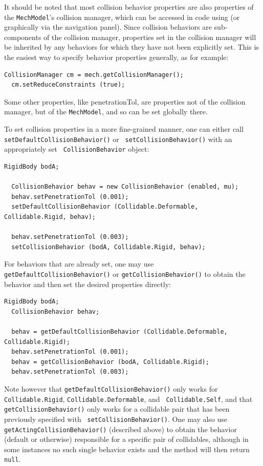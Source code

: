 It should be noted that most collision behavior properties are also
properties of the {\tt MechModel}'s collision manager, which can be
accessed in code using
(or graphically via the navigation panel).  Since collision behaviors
are sub-components of the collision manager, properties set in the
collision manager will be inherited by any behaviors for which they
have not been explicitly set. This is the easiest way to specify
behavior properties generally, as for example:
%
\begin{lstlisting}[]
  CollisionManager cm = mech.getCollisionManager();
  cm.setReduceConstraints (true);
\end{lstlisting}
%
Some other properties, like {\sf penetrationTol}, are properties not
of the collision manager, but of the {\tt MechModel}, and so can be
set globally there.

To set collision properties in a more fine-grained manner, one can
either call {\tt setDefaultCollisionBehavior()} or {\tt
setCollisionBehavior()} with an appropriately set {\tt
CollisionBehavior} object:
%
\begin{lstlisting}[]
  RigidBody bodA;

  CollisionBehavior behav = new CollisionBehavior (enabled, mu);
  behav.setPenetrationTol (0.001);
  setDefaultCollisionBehavior (Collidable.Deformable, Collidable.Rigid, behav);

  behav.setPenetrationTol (0.003);
  setCollisionBehavior (bodA, Collidable.Rigid, behav);
\end{lstlisting}
%
For behaviors that are already set, one may use {\tt
getDefaultCollisionBehavior()} or {\tt getCollisionBehavior()} to
obtain the behavior and then set the desired properties directly:
%
\begin{lstlisting}[]
  RigidBody bodA;
  CollisionBehavior behav;

  behav = getDefaultCollisionBehavior (Collidable.Deformable, Collidable.Rigid);
  behav.setPenetrationTol (0.001);
  behav = getCollisionBehavior (bodA, Collidable.Rigid);
  behav.setPenetrationTol (0.003);
\end{lstlisting}
%
Note however that {\tt getDefaultCollisionBehavior()} only works for
{\tt Collidable.Rigid}, {\tt Collidable.Deformable}, and {\tt
Collidable.Self}, and that {\tt getCollisionBehavior()} only works for
a collidable pair that has been previously specified with {\tt
setCollisionBehavior()}. One may also use {\tt
getActingCollisionBehavior()} (described above) to obtain the behavior
(default or otherwise) responsible for a specific pair of collidables,
although in some instances no such single behavior exists and the
method will then return {\tt null}.


